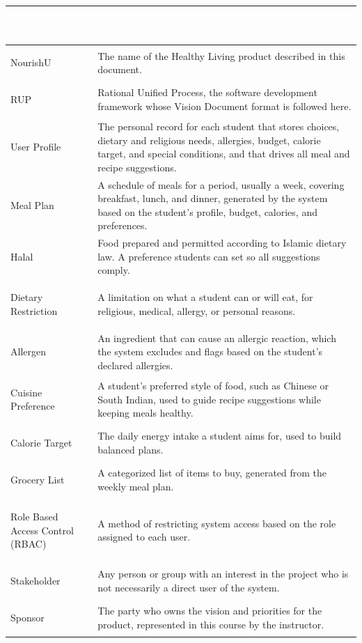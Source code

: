 \documentclass[11pt,a4paper]{article}
\begin{document}
\begin{tabularx}{\textwidth}{>{\bfseries\raggedright\arraybackslash}p{} Y}
\toprule
{}\textcolor{white}{\textbf{Term}} & \textcolor{white}{\textbf{Definition}} \\
\midrule
NourishU & The name of the Healthy Living product described in this document. \\
RUP & Rational Unified Process, the software development framework whose Vision Document format is followed here. \\
User Profile & The personal record for each student that stores choices, dietary and religious needs, allergies, budget, calorie target, and special conditions, and that drives all meal and recipe suggestions. \\
Meal Plan & A schedule of meals for a period, usually a week, covering breakfast, lunch, and dinner, generated by the system based on the student's profile, budget, calories, and preferences. \\
Halal & Food prepared and permitted according to Islamic dietary law. A preference students can set so all suggestions comply. \\
Dietary Restriction & A limitation on what a student can or will eat, for religious, medical, allergy, or personal reasons. \\
Allergen & An ingredient that can cause an allergic reaction, which the system excludes and flags based on the student's declared allergies. \\
Cuisine Preference & A student's preferred style of food, such as Chinese or South Indian, used to guide recipe suggestions while keeping meals healthy. \\
Calorie Target & The daily energy intake a student aims for, used to build balanced plans. \\
Grocery List & A categorized list of items to buy, generated from the weekly meal plan. \\
Role Based Access Control (RBAC) & A method of restricting system access based on the role assigned to each user. \\
Stakeholder & Any person or group with an interest in the project who is not necessarily a direct user of the system. \\
Sponsor & The party who owns the vision and priorities for the product, represented in this course by the instructor. \\
\bottomrule
\end{tabularx}
\end{document}
